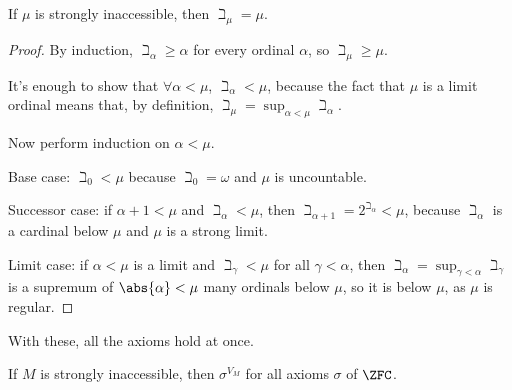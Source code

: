 \begin{boxproposition} \label{Ch3:Prop:Inaccessible_Beth}
    If $\mu$ is strongly inaccessible, then $\beth_{\mu} = \mu$.
\end{boxproposition}
\begin{proof}
    By induction, $\beth_{\alpha} \geq \alpha$ for every ordinal $\alpha$, so $\beth_{\mu} \geq \mu$.

    It's enough to show that $\forall \alpha < \mu$, $\beth_{\alpha} < \mu$, because the fact that $\mu$ is a limit ordinal means that, by definition, $\beth_{\mu} = \sup_{\alpha < \mu} \beth_{\alpha}$.

    Now perform induction on $\alpha < \mu$.
    
    Base case: $\beth_0 < \mu$ because $\beth_0 = \omega$ and $\mu$ is uncountable.

    Successor case: if $\alpha + 1 < \mu$ and $\beth_{\alpha} < \mu$, then $\beth_{\alpha + 1} = 2^{\beth_{\alpha}} < \mu$, because $\beth_{\alpha}$ is a cardinal below $\mu$ and $\mu$ is a strong limit.

    Limit case: if $\alpha < \mu$ is a limit and $\beth_{\gamma} < \mu$ for all $\gamma < \alpha$, then $\beth_{\alpha} = \sup_{\gamma < \alpha} \beth_{\gamma}$ is a supremum of $\abs{\alpha} < \mu$ many ordinals below $\mu$, so it is below $\mu$, as $\mu$ is regular.
\end{proof}

With these, all the axioms hold at once.

\begin{boxcorollary}
    If $M$ is strongly inaccessible, then $\sigma^{V_M}$ for all axioms $\sigma$ of $\ZFC$.
\end{boxcorollary}
